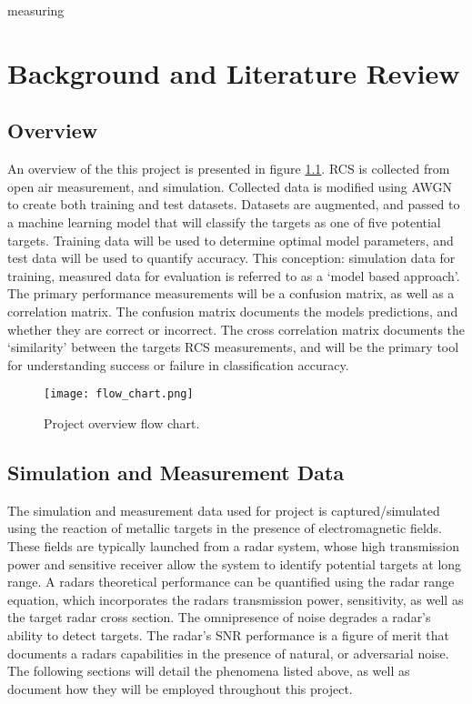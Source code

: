 measuring\chapter{Background and Literature Review}
\label{ch:background}
\glsresetall

\section{Overview}

An overview of the this project is presented in figure \ref{fig:overview}. \gls{RCS} is collected from open air measurement, and simulation. Collected data is modified using \gls{AWGN} to create both training and test datasets. Datasets are augmented, and passed to a machine learning model that will classify the targets as one of five potential targets. Training data will be used to determine optimal model parameters, and test data will be used to quantify accuracy. This conception: simulation data for training, measured data for evaluation is referred to as a `model based approach'. The primary performance measurements will be a confusion matrix, as well as a correlation matrix. The confusion matrix documents the models predictions, and whether they are correct or incorrect. The cross correlation matrix documents the `similarity' between the targets RCS measurements, and will be the primary tool for understanding success or failure in classification accuracy.

\begin{figure}[htbp]
	\centering
	 \texttt{[image: flow\_chart.png]}
	\caption[Project Overview]{Project overview flow chart.}
	\label{fig:overview}
\end{figure}

\section{Simulation and Measurement Data}

The simulation and measurement data used for project is captured/simulated using the reaction of metallic targets in the presence of electromagnetic fields. These fields are typically launched from a radar system, whose high transmission power and sensitive receiver allow the system to identify potential targets at long range. A radars theoretical performance can be quantified using the radar range equation, which incorporates the radars transmission power, sensitivity, as well as the target radar cross section. The omnipresence of noise degrades a radar's ability to detect targets. The radar's \gls{SNR} performance is a figure of merit that documents a radars capabilities in the presence of natural, or adversarial noise. The following sections will detail the phenomena listed above, as well as document how they will be employed throughout this project.

